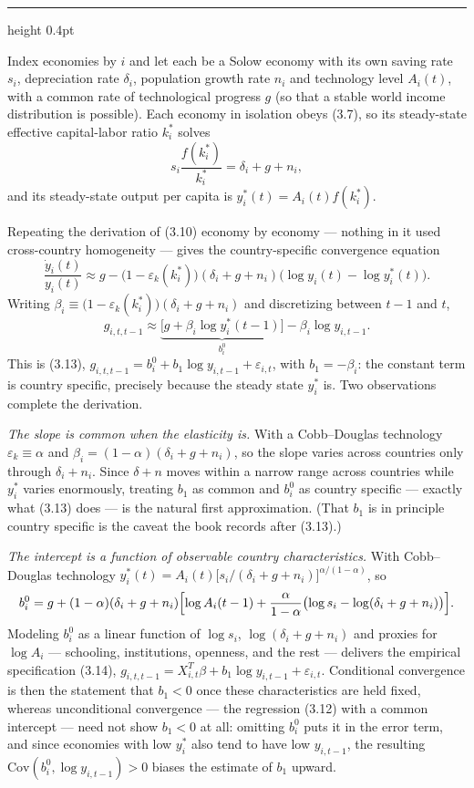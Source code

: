 \documentclass[11pt,letterpaper,reqno]{amsart}
\makeatletter
\newcommand{\dt}[1]{\dot{#1}}
\newcommand{\as@head}[3]{%
  \par\addvspace{1.6ex}\penalty-200\relax
  \phantomsection
  \addcontentsline{toc}{subsection}{#1 #2\texorpdfstring{\ifx\relax#3\relax\else\quad #3\fi}{}}%
  {\color{RuleGrey}\hrule height 0.4pt}%
  \nobreak\vspace{0.8ex}\nobreak
  \noindent{\bfseries #1 #2}%
  \ifx\relax#3\relax\else\quad{\bfseries\itshape #3}\fi
  \par\nobreak\vspace{0.4ex}\nobreak
  \as@beginstatement
}
\newcommand{\as@beginstatement}{\begingroup\itshape\ignorespaces}
\newenvironment{aex}[2]{\as@head{Exercise}{#1}{#2}}{\par\addvspace{1.2ex}}
\newcommand{\bk}[1]{\textup{\textsc{#1}}}
\renewcommand{\as@beginstatement}{\ignorespaces}
\makeatother
\begin{document}
\begin{aex}{3.5}{}
Index economies by $i$ and let each be a Solow economy with its own saving rate $s_i$, depreciation rate
$\delta_i$, population growth rate $n_i$ and technology level $A_i(t)$, with a common rate of technological
progress $g$ (so that a stable world income distribution is possible).  Each economy in isolation obeys
\bk{(3.7)}, so its steady-state effective capital-labor ratio $k_i^*$ solves
\[
s_i\frac{f(k_i^*)}{k_i^*}=\delta_i+g+n_i ,
\]
and its steady-state output per capita is $y_i^*(t)=A_i(t)f(k_i^*)$.

Repeating the derivation of \bk{(3.10)} economy by economy --- nothing in it used cross-country
homogeneity --- gives the country-specific convergence equation
\[
\frac{\dt y_i(t)}{y_i(t)}\approx g-\bigl(1-\varepsilon_k(k_i^*)\bigr)(\delta_i+g+n_i)
\bigl(\log y_i(t)-\log y_i^*(t)\bigr).
\]
Writing $\beta_i\equiv\bigl(1-\varepsilon_k(k_i^*)\bigr)(\delta_i+g+n_i)$ and discretizing between $t-1$
and $t$,
\[
g_{i,t,t-1}\approx\underbrace{\bigl[g+\beta_i\log y_i^*(t-1)\bigr]}_{\displaystyle b^0_i}
-\beta_i\log y_{i,t-1} .
\tag{$*$}
\]
This is \bk{(3.13)}, $g_{i,t,t-1}=b^0_i+b_1\log y_{i,t-1}+\varepsilon_{i,t}$, with $b_1=-\beta_i$: the
constant term is country specific, precisely because the steady state $y^*_i$ is.  Two observations complete
the derivation.

\emph{The slope is common when the elasticity is.}  With a Cobb--Douglas technology
$\varepsilon_k\equiv\alpha$ and $\beta_i=(1-\alpha)(\delta_i+g+n_i)$, so the slope varies across countries
only through $\delta_i+n_i$.  Since $\delta+n$ moves within a narrow range across countries while
$y^*_i$ varies enormously, treating $b_1$ as common and $b^0_i$ as country specific --- exactly what
\bk{(3.13)} does --- is the natural first approximation.  (That $b_1$ is in principle country specific is
the caveat the book records after \bk{(3.13)}.)

\emph{The intercept is a function of observable country characteristics.}  With Cobb--Douglas technology
$y^*_i(t)=A_i(t)\bigl[s_i/(\delta_i+g+n_i)\bigr]^{\alpha/(1-\alpha)}$, so
\[
b^0_i=g+(1-\alpha)(\delta_i+g+n_i)\Bigl[\log A_i(t-1)
+\frac{\alpha}{1-\alpha}\bigl(\log s_i-\log(\delta_i+g+n_i)\bigr)\Bigr].
\]
Modeling $b^0_i$ as a linear function of $\log s_i$, $\log(\delta_i+g+n_i)$ and proxies for $\log A_i$ ---
schooling, institutions, openness, and the rest --- delivers the empirical specification \bk{(3.14)},
$g_{i,t,t-1}=X_{i,t}^{T}\beta+b_1\log y_{i,t-1}+\varepsilon_{i,t}$.  Conditional convergence is then the
statement that $b_1<0$ once these characteristics are held fixed, whereas unconditional convergence ---
the regression \bk{(3.12)} with a common intercept --- need not show $b_1<0$ at all: omitting $b^0_i$ puts
it in the error term, and since economies with low $y^*_i$ also tend to have low $y_{i,t-1}$, the resulting
$\mathrm{Cov}(b^0_i,\log y_{i,t-1})>0$ biases the estimate of $b_1$ upward.
\end{aex}
\end{document}
